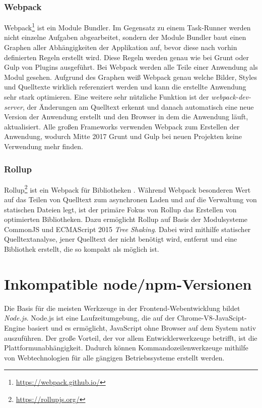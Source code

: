 \subsubsection{Webpack}
\label{sub:webpack}
Webpack\footnote{\url{https://webpack.github.io/}} ist ein Module Bundler.
Im Gegensatz zu einem Task-Runner werden nicht einzelne Aufgaben abgearbeitet, sondern der Module Bundler baut einen Graphen aller Abhängigkeiten der Applikation auf, bevor diese nach vorhin definierten Regeln erstellt wird.
Diese Regeln werden genau wie bei Grunt oder Gulp von Plugins ausgeführt.
Bei Webpack werden alle Teile einer Anwendung als Modul gesehen.
Aufgrund des Graphen weiß Webpack genau welche Bilder, Styles und Quelltexte wirklich referenziert werden und kann die erstellte Anwendung sehr stark optimieren.
Eine weitere sehr nützliche Funktion ist der \emph{webpack-dev-server}, der Änderungen am Quelltext erkennt und danach automatisch eine neue Version der Anwendung erstellt und den Browser in dem die Anwendung läuft, aktualisiert.
Alle großen Frameworks verwenden Webpack zum Erstellen der Anwendung, wodurch Mitte 2017 Grunt und Gulp bei neuen Projekten keine Verwendung mehr finden.

\subsubsection{Rollup}
\label{sub:rollup}
Rollup\footnote{\url{https://rollupjs.org/}} ist ein Webpack für Bibliotheken \autocite{Harris.webpack-vs-rollup:online}.
Während Webpack besonderen Wert auf das Teilen von Quelltext zum asynchronen Laden und auf die Verwaltung von statischen Dateien legt, ist der primäre Fokus von Rollup das Erstellen von optimierten Bibliotheken.
Dazu ermöglicht Rollup auf Basis der Modulsysteme CommonJS und ECMAScript 2015 \emph{Tree Shaking}.
Dabei wird mithilfe statischer Quelltextanalyse, jener Quelltext der nicht benötigt wird, entfernt und eine Bibliothek erstellt, die so kompakt als möglich ist.


\section{Inkompatible node/npm-Versionen}
Die Basis für die meisten Werkzeuge in der Frontend-Webentwicklung bildet \emph{Node.js}.
Node.js ist eine Laufzeitumgebung, die auf der Chrome-V8-JavaScipt-Engine basiert und es ermöglicht, JavaScript ohne Browser auf dem System nativ auszuführen.
Der große Vorteil, der vor allem Entwicklerwerkzeuge betrifft, ist die Plattformunabhängigkeit.
Dadurch können Kommandozeilenwerkzeuge mithilfe von Webtechnologien für alle gängigen Betriebssysteme erstellt werden.

